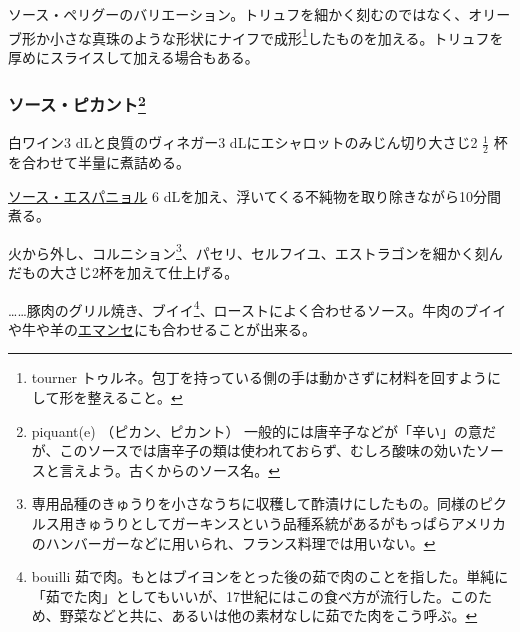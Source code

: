 \begin{recette}


ソース・ペリグーのバリエーション。トリュフを細かく刻むのではなく、オリーブ形か小さな真珠のような形状にナイフで成形\footnote{tourner
  トゥルネ。包丁を持っている側の手は動かさずに材料を回すようにして形を整えること。}したものを加える。トリュフを厚めにスライスして加える場合もある。

\atoaki{}

\hypertarget{sauce-piquante}{%
\subsubsection[ソース・ピカント]{\texorpdfstring{ソース・ピカント\footnote{piquant(e)
  （ピカン、ピカント）
  一般的には唐辛子などが「辛い」の意だが、このソースでは唐辛子の類は使われておらず、むしろ酸味の効いたソースと言えよう。古くからのソース名。}}{ソース・ピカント}}\label{sauce-piquante}}


 

白ワイン3 dLと良質のヴィネガー3 dLにエシャロットのみじん切り大さじ2
\(\frac{1}{2}\) 杯を合わせて半量に煮詰める。

\protect\hyperlink{sauce-espagnole}{ソース・エスパニョル} 6
dLを加え、浮いてくる不純物を取り除きながら10分間煮る。

火から外し、コルニション\footnote{専用品種のきゅうりを小さなうちに収穫して酢漬けにしたもの。同様のピクルス用きゅうりとしてガーキンスという品種系統があるがもっぱらアメリカのハンバーガーなどに用いられ、フランス料理では用いない。}、パセリ、セルフイユ、エストラゴンを細かく刻んだもの大さじ2杯を加えて仕上げる。

\ldots{}\ldots{}豚肉のグリル焼き、ブイイ\footnote{bouilli
  茹で肉。もとはブイヨンをとった後の茹で肉のことを指した。単純に「茹でた肉」としてもいいが、17世紀にはこの食べ方が流行した。このため、野菜などと共に、あるいは他の素材なしに茹でた肉をこう呼ぶ。}、ローストによく合わせるソース。牛肉のブイイや牛や羊の\protect\hyperlink{}{エマンセ}にも合わせることが出来る。


\end{recette}
